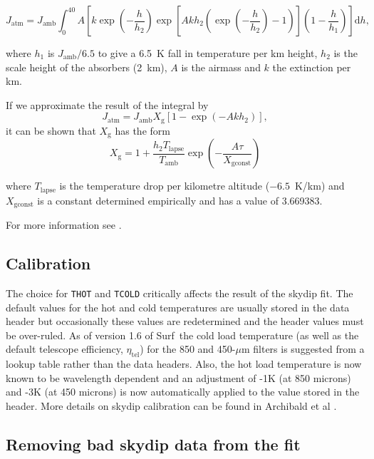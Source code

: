 \documentclass[twoside,11pt]{article}
\newcommand{\scusoft}          {{\sc Surf}}
\renewcommand{\_}{\texttt{\symbol{95}}}
\begin{document}
\begin{equation}
J_\mathrm{atm} = J_\mathrm{amb} \int_0^{40}\! A \left[k\exp\left(-\frac{h}{h_2}
\right)\exp\left[A k h_2 \left(\exp\left(-\frac{h}{h_2}\right)-1\right)\right]
\left(1-\frac{h}{h_1}\right)\right]\mathrm{d}h,
\end{equation}

where $h_1$ is $J_\mathrm{amb}/6.5$ to give a 6.5~K fall in temperature per km
height, $h_2$ is the scale height of the absorbers (2~km), $A$ is the airmass
and $k$ the extinction per km.

If we approximate the result of the integral by 
\begin{equation}
J_\mathrm{atm} = J_\mathrm{amb} X_\mathrm{g} \left[1-\exp\left(-A k h_2\right)\right],
\end{equation}
it can be shown that $X_\mathrm{g}$ has the form
\begin{equation}
X_\mathrm{g} = 1 + \frac{h_2 T_\mathrm{lapse}}{T_\mathrm{amb}}\exp\left(-\frac{A \tau}{X_\mathrm{gconst}}\right)
\end{equation}

where $T_\mathrm{lapse}$ is the temperature drop per kilometre altitude
($-6.5$~K/km) and $X_\mathrm{gconst}$ is a constant determined empirically and
has a value of 3.669383.

For more information see \cite{skydip}.

\subsection{Calibration}

The choice for \texttt{T\_HOT} and \texttt{T\_COLD} critically affects the
result of the skydip fit. The default values for the hot and cold temperatures
are usually stored in the data header but occasionally these values are
redetermined and the header values must be over-ruled.  As of version 1.6 of
\scusoft\ the cold load temperature (as well as the default telescope
efficiency, $\eta_\mathrm{tel}$) for the 850 and 450-$\mu$m filters is
suggested from a lookup table rather than the data headers. Also, the hot load
temperature is now known to be wavelength dependent and an adjustment of 
-1K (at 850 microns) and -3K (at 450 microns) is now automatically applied
to the value stored in the header. More details on skydip calibration
can be found in Archibald et al \cite{scdsn2}.

\subsection{Removing bad skydip data from the fit}
\label{skydips_eg}
\end{document}
